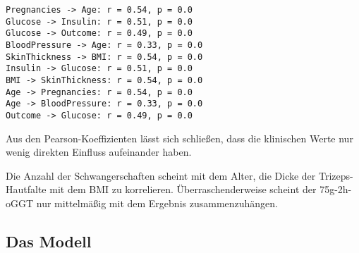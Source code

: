 \documentclass[11.5pt]{article}
\begin{document}
    \begin{Verbatim}[commandchars=\\\{\}]
Pregnancies -> Age: r = 0.54, p = 0.0
Glucose -> Insulin: r = 0.51, p = 0.0
Glucose -> Outcome: r = 0.49, p = 0.0
BloodPressure -> Age: r = 0.33, p = 0.0
SkinThickness -> BMI: r = 0.54, p = 0.0
Insulin -> Glucose: r = 0.51, p = 0.0
BMI -> SkinThickness: r = 0.54, p = 0.0
Age -> Pregnancies: r = 0.54, p = 0.0
Age -> BloodPressure: r = 0.33, p = 0.0
Outcome -> Glucose: r = 0.49, p = 0.0
    \end{Verbatim}

    Aus den Pearson-Koeffizienten lässt sich schließen, dass die klinischen
Werte nur wenig direkten Einfluss aufeinander haben.

Die Anzahl der Schwangerschaften scheint mit dem Alter, die Dicke der
Trizeps-Hautfalte mit dem BMI zu korrelieren. Überraschenderweise
scheint der 75g-2h-oGGT nur mittelmäßig mit dem Ergebnis
zusammenzuhängen.

    \hypertarget{das-modell}{%
\subsection{Das Modell}\label{das-modell}}
\end{document}
